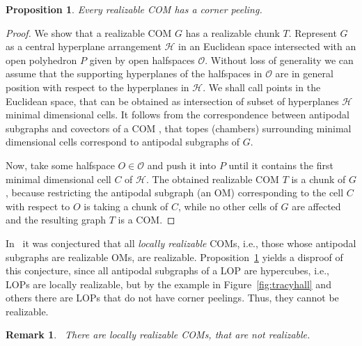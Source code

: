 \documentclass[final,11pt]{article}
\newtheorem{prop}[thm]{Proposition}%
\newtheorem{rem}[thm]{Remark}%
\begin{document}
% 
\begin{prop}\label{prop:realizable}
Every realizable COM has a corner peeling.
\end{prop}
\begin{proof}
 We show that a realizable COM $G$ has a realizable chunk $T$. Represent $G$ as a central hyperplane arrangement $\mathcal{H}$ in an Euclidean space intersected with an open polyhedron $P$ given by open halfspaces $\mathcal{O}$. Without loss of generality we can assume that the supporting hyperplanes of the halfspaces in $\mathcal{O}$ are in general position with respect to the hyperplanes in $\mathcal{H}$. 
We shall call points in the Euclidean space, that can be obtained as intersection of subset of hyperplanes $\mathcal{H}$ minimal dimensional cells. It follows from the correspondence between antipodal subgraphs and covectors of a COM \cite[Theorem 4.9]{Kna-17}, that topes (chambers) surrounding minimal dimensional cells correspond to antipodal subgraphs of $G$.
 
 Now, take some halfspace $O\in\mathcal{O}$ and push it into $P$ until it contains the first minimal dimensional cell $C$ of $\mathcal{H}$. The obtained realizable COM $T$ is a chunk of $G$, because restricting the antipodal subgraph (an OM) corresponding to the cell $C$ with respect to $O$ is taking a chunk of $C$, while no other cells of $G$ are affected and the resulting graph $T$ is a COM.
\end{proof}


In~\cite[Conjecture 2]{Ban-18} it was conjectured that all \emph{locally realizable} COMs, i.e., those whose antipodal subgraphs are realizable OMs, are realizable. Proposition~\ref{prop:realizable} yields a disproof of this conjecture, since all antipodal subgraphs of a LOP are hypercubes, i.e., LOPs are locally realizable, but by the example in Figure~\ref{fig:tracyhall} and others there are LOPs that do not have corner peelings. Thus, they cannot be realizable. 

\begin{rem}~\label{rem:notrealizable}
 There are locally realizable COMs, that are not realizable.
\end{rem}
\end{document}
